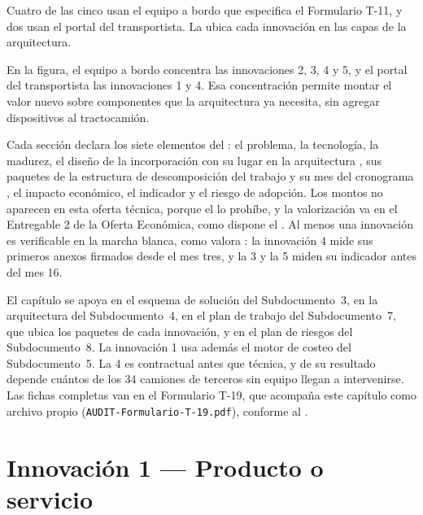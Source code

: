 Cuatro de las cinco usan el equipo a bordo que especifica el Formulario T-11, y dos usan el portal del
transportista. La  ubica cada innovación en las capas de la arquitectura.


En la figura, el equipo a bordo concentra las innovaciones 2, 3, 4 y 5, y el portal del transportista
las innovaciones 1 y 4. Esa concentración permite montar el valor nuevo sobre componentes que la
arquitectura ya necesita, sin agregar dispositivos al tractocamión.

Cada sección declara los siete elementos del : el problema, la tecnología, la madurez, el
diseño de la incorporación con su lugar en la arquitectura , sus paquetes de la
estructura de descomposición del trabajo y su mes del cronograma , el impacto
económico, el indicador y el riesgo de adopción. Los montos no aparecen en esta oferta técnica, porque
el  lo prohíbe, y la valorización va en el Entregable 2 de la Oferta Económica, como
dispone el . Al menos una innovación es verificable en la marcha blanca, como valora
: la innovación 4 mide sus primeros anexos firmados desde el mes tres, y la 3 y
la 5 miden su indicador antes del mes 16.

El capítulo se apoya en el esquema de solución del Subdocumento~3, en la arquitectura del
Subdocumento~4, en el plan de trabajo del Subdocumento~7, que ubica los paquetes de cada innovación, y
en el plan de riesgos del Subdocumento~8. La innovación 1 usa además el motor de costeo del
Subdocumento~5. La 4 es contractual antes que técnica, y de su resultado depende cuántos de los 34
camiones de terceros sin equipo llegan a intervenirse. Las fichas completas van en el Formulario T-19, que acompaña
este capítulo como archivo propio (\texttt{AUDIT-Formulario-T-19.pdf}), conforme al
.

\section{Innovación 1 — Producto o servicio}\label{sec:13-innovacion-1}


